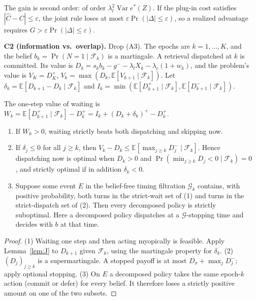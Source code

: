 The gain is second order: of order $\lambda_l^{2}\operatorname{Var}e^{*}(Z)$.
If the plug-in cost satisfies $|\hat C-C|\le\varepsilon$, the joint rule loses
at most $\varepsilon\Pr(|\Delta|\le\varepsilon)$, so a realized advantage
requires $G>\varepsilon\Pr(|\Delta|\le\varepsilon)$.

\textbf{C2 (information vs.\ overlap).} Drop (A3). The epochs are
$k=1,\dots,K$, and the belief $b_k=\Pr(N=1\mid\mathcal F_k)$ is a martingale.
A retrieval dispatched at $k$ is committed. Its value is
$D_k=s_kb_k-g^{-}-\lambda_lX_k-\lambda_c(1+w_k)$, and the problem's value is
$V_K=D_K^{+}$, $V_k=\max(D_k,\mathbb E[V_{k+1}\mid\mathcal F_k])$. Let
$\delta_k=\mathbb E[D_{k+1}-D_k\mid\mathcal F_k]$ and
$I_k=\min(\mathbb E[D_{k+1}^{+}\mid\mathcal F_k],\mathbb E[D_{k+1}^{-}\mid\mathcal F_k])$.

\begin{proposition}[C2]\label{prop:c2}
The one-step value of waiting is
$W_k=\mathbb E[D_{k+1}^{+}\mid\mathcal F_k]-D_k^{+}=I_k+(D_k+\delta_k)^{+}-D_k^{+}$.
\begin{enumerate}
\item If $W_k>0$, waiting strictly beats both dispatching and skipping now.
\item If $\delta_j\le0$ for all $j\ge k$, then
$V_k-D_k\le\mathbb E[\max_{j\ge k}D_j^{-}\mid\mathcal F_k]$. Hence dispatching
now is optimal when $D_k>0$ and $\Pr(\min_{j\ge k}D_j<0\mid\mathcal F_k)=0$, and
strictly optimal if in addition $\delta_k<0$.
\item Suppose some event $E$ in the belief-free timing filtration
$\mathcal G_k$ contains, with positive probability, both turns in the strict-wait
set of (1) and turns in the strict-dispatch set of (2). Then every decomposed
policy is strictly suboptimal. Here a decomposed policy dispatches at a
$\mathcal G$-stopping time and decides with $b$ at that time.
\end{enumerate}
\end{proposition}
\begin{proof}
(1) Waiting one step and then acting myopically is feasible. Apply
Lemma~\ref{lem:J} to $D_{k+1}$ given $\mathcal F_k$, using the martingale
property for $\delta_k$.
(2) $(D_j)_{j\ge k}$ is a supermartingale. A stopped payoff is at most
$D_\sigma+\max_jD_j^{-}$; apply optional stopping.
(3) On $E$ a decomposed policy takes the same epoch-$k$ action (commit or
defer) for every belief. It therefore loses a strictly positive amount on one
of the two subsets.
\end{proof}

